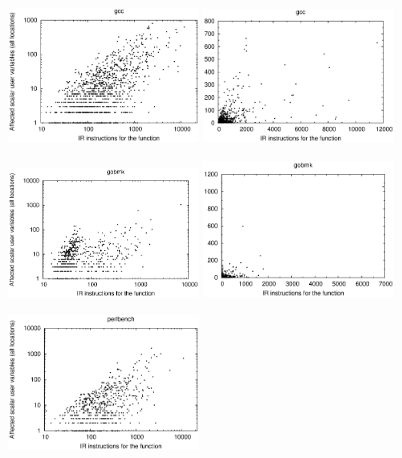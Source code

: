 \begin{figure}[!t]
\begin{center}
\centerline{
\includegraphics[width=0.45\textwidth]{figures/CS-debug-tot-dead/tot-dead-gcc-logscale.eps}
\includegraphics[width=0.45\textwidth]{figures/CS-debug-tot-dead/tot-dead-gcc-linear.eps}
}
\vspace{2mm}
\centerline{
\includegraphics[width=0.45\textwidth]{figures/CS-debug-tot-dead/tot-dead-gobmk-logscale.eps}
\includegraphics[width=0.45\textwidth]{figures/CS-debug-tot-dead/tot-dead-gobmk-linear.eps}
}
\vspace{2mm}
\centerline{
\includegraphics[width=0.45\textwidth]{figures/CS-debug-tot-dead/tot-dead-perlbench-logscale.eps}
}
\end{center}
\end{figure}
